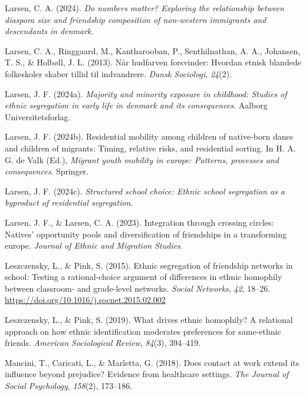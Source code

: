 \documentclass[
]{book}
\newlength{\cslhangindent}
\newenvironment{CSLReferences}[2] %
 {\begin{list}{}{%
  \setlength{\itemindent}{0pt}
  \setlength{\leftmargin}{0pt}
  \setlength{\parsep}{0pt}
  \ifodd #1
   \setlength{\leftmargin}{\cslhangindent}
   \setlength{\itemindent}{-1\cslhangindent}
  \fi
  \setlength{\itemsep}{#2\baselineskip}}}
 {\end{list}}
\begin{document}
\begin{CSLReferences}{1}{0}
Larsen, C. A. (2024). \emph{Do numbers matter? Exploring the relationship between diaspora size and friendship composition of non-western immigrants and descendants in denmark}.

Larsen, C. A., Ringgaard, M., Kantharooban, P., Senthilnathan, A. A., Johansen, T. S., \& Holbøll, J. L. (2013). Når hudfarven forsvinder: Hvordan etnisk blandede folkeskoler skaber tillid til indvandrere. \emph{Dansk Sociologi}, \emph{24}(2).

Larsen, J. F. (2024a). \emph{Majority and minority exposure in childhood: Studies of ethnic segregation in early life in denmark and its consequences}. Aalborg Universitetsforlag.

Larsen, J. F. (2024b). Residential mobility among children of native-born danes and children of migrants: Timing, relative risks, and residential sorting. In H. A. G. de Valk (Ed.), \emph{Migrant youth mobility in europe: Patterns, processes and consequences}. Springer.

Larsen, J. F. (2024c). \emph{Structured school choice: Ethnic school segregation as a byproduct of residential segregation}.

Larsen, J. F., \& Larsen, C. A. (2023). Integration through crossing circles: Natives' opportunity pools and diversification of friendships in a transforming europe. \emph{Journal of Ethnic and Migration Studies}.

Leszczensky, L., \& Pink, S. (2015). Ethnic segregation of friendship networks in school: Testing a rational-choice argument of differences in ethnic homophily between classroom- and grade-level networks. \emph{Social Networks}, \emph{42}, 18--26. \url{https://doi.org/10.1016/j.socnet.2015.02.002}

Leszczensky, L., \& Pink, S. (2019). What drives ethnic homophily? A relational approach on how ethnic identification moderates preferences for same-ethnic friends. \emph{American Sociological Review}, \emph{84}(3), 394--419.

Mancini, T., Caricati, L., \& Marletta, G. (2018). Does contact at work extend its influence beyond prejudice? Evidence from healthcare settings. \emph{The Journal of Social Psychology}, \emph{158}(2), 173--186.


\end{CSLReferences}
\end{document}
